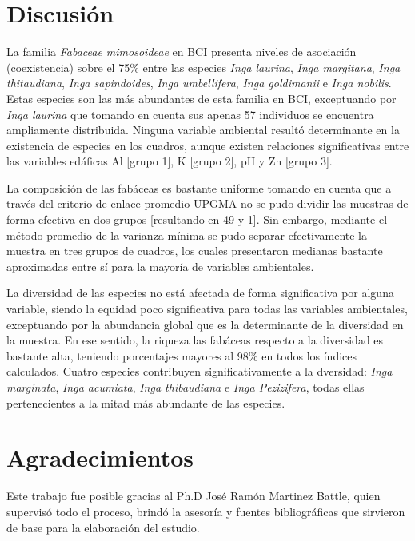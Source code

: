 \documentclass[11pt,]{article}
\begin{document}
\section{Discusión}\label{discusiuxf3n}

La familia \emph{Fabaceae mimosoideae} en BCI presenta niveles de
asociación (coexistencia) sobre el 75\% entre las especies \emph{Inga
laurina}, \emph{Inga margitana}, \emph{Inga thitaudiana}, \emph{Inga
sapindoides}, \emph{Inga umbellifera}, \emph{Inga goldimanii} e
\emph{Inga nobilis}. Estas especies son las más abundantes de esta
familia en BCI, exceptuando por \emph{Inga laurina} que tomando en
cuenta sus apenas 57 individuos se encuentra ampliamente distribuida.
Ninguna variable ambiental resultó determinante en la existencia de
especies en los cuadros, aunque existen relaciones significativas entre
las variables edáficas Al {[}grupo 1{]}, K {[}grupo 2{]}, pH y Zn
{[}grupo 3{]}.

La composición de las fabáceas es bastante uniforme tomando en cuenta
que a través del criterio de enlace promedio UPGMA no se pudo dividir
las muestras de forma efectiva en dos grupos {[}resultando en 49 y 1{]}.
Sin embargo, mediante el método promedio de la varianza mínima se pudo
separar efectivamente la muestra en tres grupos de cuadros, los cuales
presentaron medianas bastante aproximadas entre sí para la mayoría de
variables ambientales.

La diversidad de las especies no está afectada de forma significativa
por alguna variable, siendo la equidad poco significativa para todas las
variables ambientales, exceptuando por la abundancia global que es la
determinante de la diversidad en la muestra. En ese sentido, la riqueza
las fabáceas respecto a la diversidad es bastante alta, teniendo
porcentajes mayores al 98\% en todos los índices calculados. Cuatro
especies contribuyen significativamente a la dversidad: \emph{Inga
marginata}, \emph{Inga acumiata}, \emph{Inga thibaudiana} e \emph{Inga
Pezizifera}, todas ellas pertenecientes a la mitad más abundante de las
especies.

\section{Agradecimientos}\label{agradecimientos}

Este trabajo fue posible gracias al Ph.D José Ramón Martinez Battle,
quien supervisó todo el proceso, brindó la asesoría y fuentes
bibliográficas que sirvieron de base para la elaboración del estudio.
\end{document}
